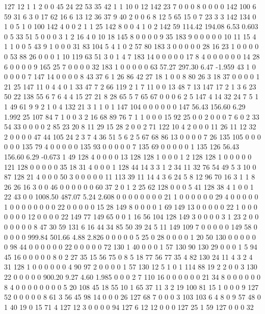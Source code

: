  127 12 1 1 2 0 0 45 24 22 53 35 42 1 1 10 0 12 142 23
 7 0 0 0 8 0 0 0 0 142 100 6 59 31 6 3 0 17 62 16
 6 13 12 36 37 9 40 2 0 0 6 8 12 5 65 15 0 7 23 3
 3 142 134 0 1 0 5 1 0 100 142 4 0 0 2 1 1 25 142 8
 0 0 4 1 0 2 142 59
114.42 194.08 6.53 0.603
 0 5 33 51 5 0 0 0 3 1 2 16 4 0 10 18 145 8 0 0
 0 0 9 35 183 9 0 0 0 0 0 10 11 15 4 1 1 0 0 5
 43 9 1 0 0 0 31 83 104 5 4 1 0 2 57 80 183 3 0 0
 0 0 0 28 16 23 1 0 0 0 0 0 53 88 26 0 0 0 1 10
 119 63 51 3 0 1 4 7 183 14 0 0 0 0 0 17 8 4 0 0
 0 0 0 0 14 28 6 0 0 0 0 9 165 25 7 0 0 0 0 32
 183 1 0 0 0 0 0 63
57.27 297.30 6.47 -1.959
 43 1 0 0 0 0 0 7 147 14 0 0 0 0 8 43 37 6 1 26
 86 42 27 18 1 0 0 8 80 26 3 18 37 0 0 0 0 1 21 25
 147 11 0 4 4 0 1 33 47 7 2 66 119 2 1 7 11 0 0 13
 48 7 13 147 17 2 1 3 6 23 50 22 138 55 6 7 6 4 4 15
 27 21 8 28 65 5 7 65 67 0 0 0 6 2 5 147 4 14 32 24
 7 5 1 1 49 61 9 9 2 1 0 4 132 21 3 1 1 0 1 147
 104 0 0 0 0 0 0 147
56.43 156.60 6.29 1.992
 25 107 84 7 1 0 0 3 2 16 68 89 76 7 1 1 0 0 0 15
 92 25 0 0 2 0 0 0 7 6 0 2 33 54 33 0 0 0 0 2
 85 23 20 8 11 29 15 28 2 0 0 2 71 122 10 4 2 0 0 0
 11 26 11 12 32 2 0 0 0 0 47 44 105 24 2 3 7 4 36 51
 5 6 2 5 67 68 86 13 0 0 0 0 7 26 135 105 0 0 0 0
 0 0 135 79 4 0 0 0 0 0 135 93 0 0 0 0 0 7 135 69
 0 0 0 0 0 1 135 126
56.43 156.60 6.29 -0.673
 1 49 128 4 0 0 0 0 13 128 128 1 0 0 0 1 2 128 128 1
 0 0 0 0 0 121 128 0 0 0 0 0 35 18 31 4 0 0 0 1
 128 44 14 3 3 1 2 34 11 32 76 54 49 5 3 10 0 87 128 21
 4 0 0 0 50 3 0 0 0 0 0 11 113 39 11 14 4 3 6 24
 5 8 12 96 70 16 3 1 1 8 26 26 16 3 0 0 46 0 0 0
 0 0 0 60 37 2 0 1 2 25 62 128 0 0 0 5 41 128 38 4
 1 0 0 1 22 43 0 0
1008.50 487.07 5.24 2.608
 0 0 0 0 0 0 0 0 21 1 0 0 0 0 0 0 29 4 0 0
 0 0 0 1 0 0 0 0 0 0 0 0 22 0 0 0 0 0 15 28
 149 8 0 0 0 0 1 69 149 13 0 0 0 0 0 22 1 0 0 0
 0 0 0 0 12 0 0 0 0 22 149 77 149 65 0 0 1 16 56 104
 128 149 3 0 0 0 0 3 1 23 2 0 0 0 0 0 0 0 8 47
 30 59 131 6 16 44 34 85 50 39 24 5 11 149 109 7 0 0 0 0
 0 149 58 0 0 0 0 0
999.84 501.66 4.88 2.826
 0 0 0 0 0 5 25 0 28 0 0 0 0 1 20 50 130 0 0 0
 0 0 0 98 44 0 0 0 0 0 0 22 0 0 0 0 0 72 130 1
 40 0 0 0 1 57 130 90 130 29 0 0 0 1 5 94 45 16 0 0
 0 0 0 8 0 2 27 35 15 56 75 0 8 5 18 77 56 77 35 4
 82 130 24 11 4 3 2 4 31 128 1 0 0 0 0 0 0 4 90 97
 2 0 0 0 0 1 57 130 12 5 1 0 1 114 88 19 2 2 0 0
 3 130 22 0 0 0 0 0
900.20 9.27 4.60 1.985
 0 0 0 2 7 110 16 0 0 0 0 0 0 21 34 8 0 0 0 0
 0 0 8 4 0 0 0 0 0 0 0 0 5 20 108 45 18 55 10 1
 65 37 11 3 2 19 100 81 15 1 0 0 0 9 127 52 0 0 0 0
 0 8 61 3 56 45 98 14 0 0 0 26 127 68 7 0 0 0 3 103
 103 6 4 8 0 9 57 48 0 1 40 19 0 15 71 4 127 12 3 0
 0 0 0 94 127 6 12 12 0 0 0 127 25 1 59 127 0 0 0 32
